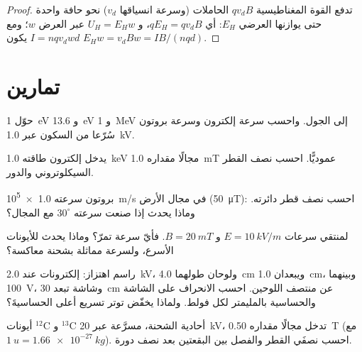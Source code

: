 \begin{proof}
تدفع القوة المغناطيسية $qv_dB$ الحاملات (وسرعة انسياقها $v_d$)
نحو حافة واحدة حتى يوازنها  العرضي $E_H$:
أي $qE_H = qv_dB$، و $U_H = E_Hw$ عبر العرض $w$؛ ومع $I = nqv_dwd$ يكون
$E_Hw = v_dBw = IB/(nqd)$.
\end{proof}

\section{تمارين}

\begin{exercise}[$\star$]\label{exo:b1:charged-particles:1}
حوّل \qty{1}{eV} و \qty{13.6}{eV} و \qty{1}{MeV} إلى الجول. واحسب سرعة
إلكترون وسرعة بروتون سُرّعا من السكون عبر \qty{1.0}{kV}.
\end{exercise}

\begin{exercise}[$\star$]\label{exo:b1:charged-particles:2}
يدخل إلكترون طاقته \qty{1.0}{keV} مجالًا مقداره \qty{1.0}{mT} عموديًّا.
احسب نصف القطر  السيكلوتروني والدور.
\end{exercise}

\begin{exercise}[$\star$]\label{exo:b1:charged-particles:3}
بروتون سرعته \qty{1.0e5}{m/s} في مجال الأرض (\qty{50}{\micro T}):
احسب نصف قطر دائرته. وماذا يحدث إذا صنعت سرعته $30^\circ$ مع
المجال؟
\end{exercise}

\begin{exercise}[$\star$]\label{exo:b1:charged-particles:4}
لمنتقي سرعات $E = \qty{10}{kV/m}$ و $B = \qty{20}{mT}$. فأيّ
سرعة تمرّ؟ وماذا يحدث للأيونات الأسرع، ولسرعة مماثلة بشحنة
معاكسة؟
\end{exercise}

\begin{exercise}[$\star\star$]\label{exo:b1:charged-particles:5}
راسم اهتزاز: إلكترونات عند \qty{2.0}{kV}، ولوحان طولهما \qty{4.0}{cm}
ويبعدان \qty{1.0}{cm}، وبينهما \qty{100}{V}، وشاشة تبعد \qty{30}{cm}
عن منتصف اللوحين. احسب الانحراف على الشاشة والحساسية بالمليمتر لكل فولط.
ولماذا يخفّض توتر تسريع أعلى الحساسيةَ؟
\end{exercise}

\begin{exercise}[$\star\star$]\label{exo:b1:charged-particles:6}
أيونات $^{12}$C و $^{13}$C أحادية الشحنة، مسرَّعة عبر
\qty{20}{kV}، تدخل مجالًا مقداره \qty{0.50}{T} (مع $\qty{1}{u} = \qty{1.66e-27}{kg}$).
احسب نصفَي القطر والفصل بين البقعتين بعد نصف دورة.
\end{exercise}

